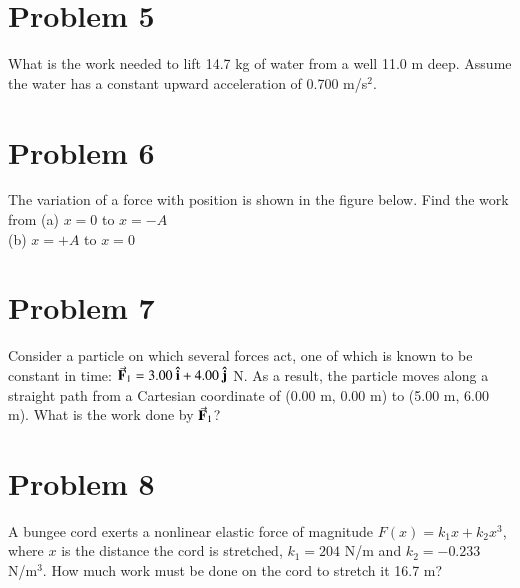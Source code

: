 \documentclass{article}
\begin{document}
\section*{Problem 5}
What is the work needed to lift 14.7 kg of water from a well 11.0 m deep. Assume the water has a constant
upward acceleration of 0.700 m/s$^2$.

\section*{Problem 6}
The variation of a force with position is shown in the figure below. Find the work from
(a) $x = 0$ to $x = -A$ \\
(b) $x = +A$ to $x = 0$

\section*{Problem 7}
Consider a particle on which several forces act, one of which is known to be constant in time:
$\va{F}_1 = 3.00\ \vu{i} + 4.00\ \vu{j}$ N. As a result, the particle moves along a straight path from a Cartesian coordinate of
(0.00 m, 0.00 m) to (5.00 m, 6.00 m). What is the work done by $\va{F}_1$?

\section*{Problem 8}
A bungee cord exerts a nonlinear elastic force of magnitude $F(x) = k_1 x + k_2 x^3$, where $x$ is the distance the cord is stretched, $k_1 = 204$ N/m and $k_2 = -0.233$ N/m$^3$. How much work must be done on the cord to stretch it 16.7 m?
\end{document}
